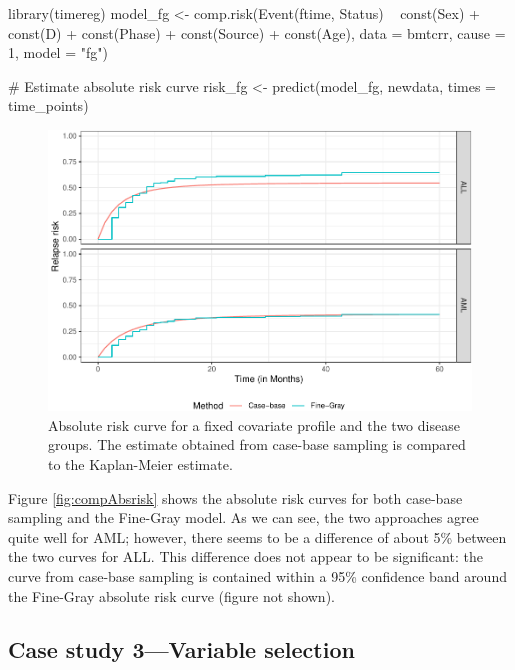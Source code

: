 \begin{Schunk}
\begin{Sinput}
library(timereg)
model_fg <- comp.risk(Event(ftime, Status) ~ const(Sex) + const(D) +
                        const(Phase) + const(Source) + const(Age),
                      data = bmtcrr, cause = 1, model = "fg")

# Estimate absolute risk curve
risk_fg <- predict(model_fg, newdata, times = time_points)
\end{Sinput}
\end{Schunk}

\begin{Schunk}
\begin{figure}[ht]
\includegraphics[width=\textwidth,keepaspectratio=true]{../figures/bmtcrr-risk-1} \caption{\label{fig:compAbsrisk} Absolute risk curve for a fixed covariate profile and the two disease groups. The estimate obtained from case-base sampling is compared to the Kaplan-Meier estimate.}\label{fig:bmtcrr-risk}
\end{figure}
\end{Schunk}

Figure \ref{fig:compAbsrisk} shows the absolute risk curves for both
case-base sampling and the Fine-Gray model. As we can see, the two
approaches agree quite well for AML; however, there seems to be a
difference of about 5\% between the two curves for ALL. This difference
does not appear to be significant: the curve from case-base sampling is
contained within a 95\% confidence band around the Fine-Gray absolute
risk curve (figure not shown).

\hypertarget{case-study-3variable-selection}{%
\subsection{Case study 3---Variable
selection}\label{case-study-3variable-selection}}


